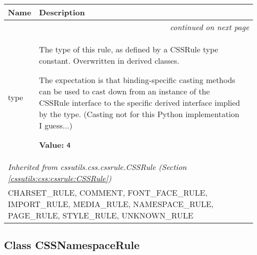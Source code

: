     \vspace{-1cm}
\hspace{\varindent}\begin{longtable}{|p{\varnamewidth}|p{\vardescrwidth}|l}
\cline{1-2}
\cline{1-2} \centering \textbf{Name} & \centering \textbf{Description}& \\
\cline{1-2}
\endhead\cline{1-2}\multicolumn{3}{r}{\small\textit{continued on next page}}\\\endfoot\cline{1-2}
\endlastfoot\raggedright t\-y\-p\-e\- & \raggedright The type of this rule, as defined by a CSSRule type constant.
Overwritten in derived classes.

The expectation is that binding-specific casting methods can be used to
cast down from an instance of the CSSRule interface to the specific
derived interface implied by the type.
(Casting not for this Python implementation I guess...)

\textbf{Value:} 
{\tt 4}&\\
\cline{1-2}
\multicolumn{2}{|l|}{\textit{Inherited from cssutils.css.cssrule.CSSRule \textit{(Section \ref{cssutils:css:cssrule:CSSRule})}}}\\
\multicolumn{2}{|p{\varwidth}|}{\raggedright CHARSET\_RULE, COMMENT, FONT\_FACE\_RULE, IMPORT\_RULE, MEDIA\_RULE, NAMESPACE\_RULE, PAGE\_RULE, STYLE\_RULE, UNKNOWN\_RULE}\\
\cline{1-2}
\end{longtable}



\subsection{Class CSSNamespaceRule}

